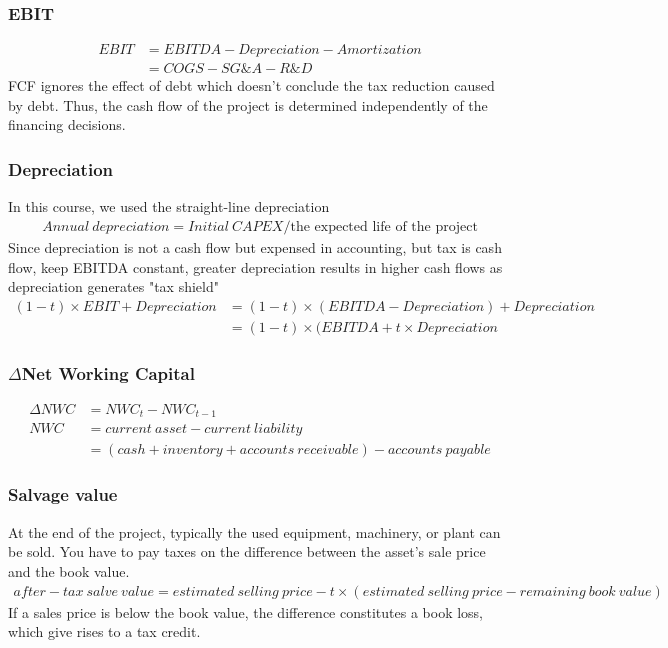 \documentclass{article}
\theoremstyle{definition}
\theoremstyle{thrm}
\theoremstyle{lma}
\theoremstyle{ppst}
\theoremstyle{crlr}
\begin{document}
\subsubsection{EBIT}
\begin{align*}
	EBIT &= EBITDA-Depreciation-Amortization\\
	&= COGS - SG\&A - R\&D
\end{align*}
FCF ignores the effect of debt which doesn't conclude the tax reduction caused by debt. Thus, the cash flow of the project is determined independently of the financing decisions. 
\subsubsection{Depreciation}
In this course, we used the straight-line depreciation
\begin{align*}
	Annual \ depreciation = Initial \ CAPEX/\text{the expected life of the project}
\end{align*}
Since depreciation is not a cash flow but expensed in accounting, but tax is cash flow, keep EBITDA constant, greater depreciation results in higher cash flows as depreciation generates "tax shield"
\begin{align*}
	(1-t)\times EBIT + Depreciation &= (1-t)\times (EBITDA - Depreciation)+ Depreciation\\
	&= (1-t)\times (EBITDA+t\times Depreciation
\end{align*}

\subsubsection{$\Delta$Net Working Capital}
\begin{align*}
	\Delta NWC &= NWC_t - NWC_{t-1}\\
	NWC &= current \ asset - current \ liability \\
	&= (cash+inventory+accounts \ receivable) - accounts \ payable
\end{align*}

\subsubsection{Salvage value}
At the end of the project, typically the used equipment, machinery, or plant can be sold. You have to pay taxes on the difference between the asset's sale price and the book value.
\begin{align*}
	after-tax\ salve \ value= estimated \ selling \ price - t\times (estimated \ selling \ price - remaining\ book\ value)
\end{align*}
If a sales price is below the book value, the difference constitutes a book loss, which give rises to a tax credit. 
\end{document}

